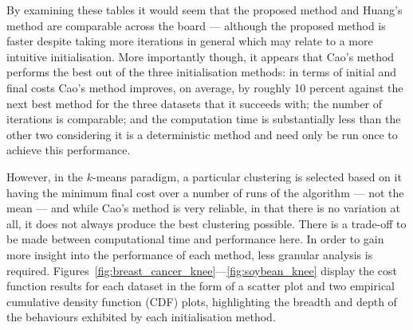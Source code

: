 \documentclass[11pt]{article}
\newlength{\tablewidth}
\begin{document}
\begin{table}[htbp]
{    }
    \label{tab:nursery_knee}\vspace{20pt}

    \label{tab:soybean_knee}
\end{table}

By examining these tables it would seem that the proposed method and Huang's
method are comparable across the board --- although the proposed method is
faster despite taking more iterations in general which may relate to a more
intuitive initialisation. More importantly though, it appears that Cao's method
performs the best out of the three initialisation methods: in terms of initial
and final costs Cao's method improves, on average, by roughly 10 percent against
the next best method for the three datasets that it succeeds with; the number of
iterations is comparable; and the computation time is substantially less than
the other two considering it is a deterministic method and need only be run once
to achieve this performance.

However, in the \(k\)-means paradigm, a particular clustering is selected based
on it having the minimum final cost over a number of runs of the algorithm ---
not the mean --- and while Cao's method is very reliable, in that there is no
variation at all, it does not always produce the best clustering possible. There
is a trade-off to be made between computational time and performance here. In
order to gain more insight into the performance of each method, less granular
analysis is required.
Figures~\ref{fig:breast_cancer_knee}---\ref{fig:soybean_knee} display the
cost function results for each dataset in the form of a scatter plot and two
empirical cumulative density function (CDF) plots, highlighting the breadth and
depth of the behaviours exhibited by each initialisation method.
\end{document}
